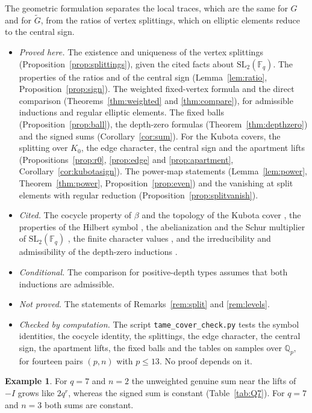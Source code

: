 \documentclass[12pt,letterpaper]{article}
\numberwithin{equation}{section}
\theoremstyle{definition}
\newtheorem{example}[theorem]{Example}
\theoremstyle{remark}
\newcommand{\kk}{\mathbb F_q}
\newcommand{\Gt}{\widetilde G}
\begin{document}
The geometric formulation separates the local traces, which are the same for $G$ and for $\Gt$, from the ratios of vertex splittings, which on elliptic elements reduce to the central sign.
\begin{itemize}[leftmargin=2em]
\item \emph{Proved here.} The existence and uniqueness of the vertex splittings (Proposition~\ref{prop:splittings}), given the cited facts about $\mathrm{SL}_2(\kk)$. The properties of the ratios and of the central sign (Lemma~\ref{lem:ratio}, Proposition~\ref{prop:sign}). The weighted fixed-vertex formula and the direct comparison (Theorems~\ref{thm:weighted} and \ref{thm:compare}), for admissible inductions and regular elliptic elements. The fixed balls (Proposition~\ref{prop:ball}), the depth-zero formulas (Theorem~\ref{thm:depthzero}) and the signed sums (Corollary~\ref{cor:sum}). For the Kubota covers, the splitting over $K_0$, the edge character, the central sign and the apartment lifts (Propositions~\ref{prop:r0}, \ref{prop:edge} and \ref{prop:apartment}, Corollary~\ref{cor:kubotasign}). The power-map statements (Lemma~\ref{lem:power}, Theorem~\ref{thm:power}, Proposition~\ref{prop:even}) and the vanishing at split elements with regular reduction (Proposition~\ref{prop:splitvanish}).
\item \emph{Cited.} The cocycle property of $\beta$ and the topology of the Kubota cover \cite{Ku67}, the properties of the Hilbert symbol \cite{Ne86}, the abelianization and the Schur multiplier of $\mathrm{SL}_2(\kk)$ \cite{Sc07,St81}, the finite character values \cite{DL76,Bo11}, and the irreducibility and admissibility of the depth-zero inductions \cite{MP94,MP96,HW09,BH06}.
\item \emph{Conditional.} The comparison for positive-depth types assumes that both inductions are admissible.
\item \emph{Not proved.} The statements of Remarks~\ref{rem:split} and \ref{rem:levels}.
\item \emph{Checked by computation.} The script \texttt{tame\_cover\_check.py} tests the symbol identities, the cocycle identity, the splittings, the edge character, the central sign, the apartment lifts, the fixed balls and the tables on samples over $\mathbb Q_p$, for fourteen pairs $(p,n)$ with $p\le13$. No proof depends on it.
\end{itemize}

\begin{example}
For $q=7$ and $n=2$ the unweighted genuine sum near the lifts of $-I$ grows like $2q^r$, whereas the signed sum is constant (Table~\ref{tab:Q7}). For $q=7$ and $n=3$ both sums are constant.
\end{example}
\end{document}
